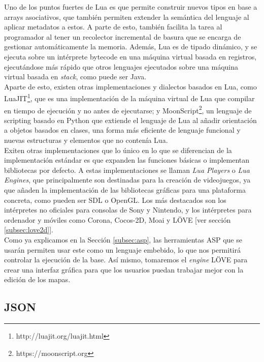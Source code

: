 Uno de los puntos fuertes de Lua es que permite construir nuevos tipos en base a arrays asociativos, que también permiten extender la semántica del lenguaje al aplicar metadatos a estos. A parte de esto, también facilita la tarea al programador al tener un recolector incremental de basura que se encarga de gestionar automáticamente la memoria. Además, Lua es de tipado dinámico, y se ejecuta sobre un intérprete bytecode en una máquina virtual basada en registros, ejecutándose más rápido que otros lenguajes ejecutados sobre una máquina virtual basada en \textit{stack}, como puede ser Java. \\

Aparte de esto, existen otras implementaciones y dialectos basados en Lua, como LuaJIT\footnote{http://luajit.org/luajit.html}, que es una implementación de la máquina virtual de Lua que compilar en tiempo de ejecución y no antes de ejecutarse; y MoonScript\footnote{https://moonscript.org}, un lenguaje de scripting basado en Python que extiende el lenguaje de Lua al añadir orientación a objetos basados en clases, una forma más eficiente de lenguaje funcional y nuevas estructuras y elementos que no contenía Lua. \\

Exiten otras implementaciones que lo único en lo que se diferencian de la implementación estándar es que expanden las funciones básicas o implementan bibliotecas por defecto. A estas implementaciones se llaman \textit{Lua Players} o \textit{Lua Engines}, que principalmente son destinadas para la creación de videojuegos, ya que añaden la implementación de las bibliotecas gráficas para una plataforma concreta, como pueden ser SDL o OpenGL. Los más destacados son los intérpretes no oficiales para consolas de Sony y Nintendo, y los intérpretes para ordenador y móviles como Corona, Cocos-2D, Moai y LÖVE [ver sección \ref{subsec:love2d}]. \\

Como ya explicamos en la Sección \ref{subsec:asp}, las herramientas ASP que se usarán permiten usar este como un lenguaje embebido, lo que nos permitirá controlar la ejecución de la base. Así mismo, tomaremos el \textit{engine} LÖVE para crear una interfaz gráfica para que los usuarios puedan trabajar mejor con la edición de los mapas.

\subsection{JSON}

